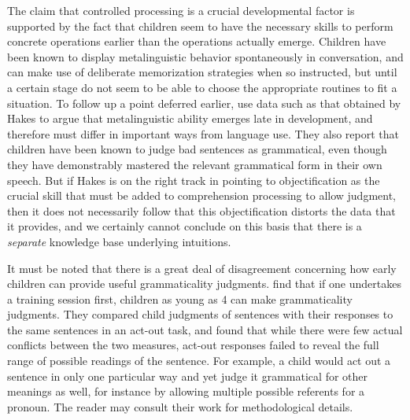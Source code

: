 The claim that controlled processing is a crucial developmental factor is supported by the fact that children seem to have the necessary skills to perform concrete operations earlier than the operations actually  emerge.  Children  have been known to display metalinguistic behavior  spontaneously  in  conversation, and can make use of deliberate memorization strategies when so instructed, but until a certain stage do not seem to be able to choose the appropriate routines to fit a situation. To follow up a point deferred earlier, \citeauthor{HirshPasekEtAl1978} use data such as that obtained by Hakes to argue that metalinguistic ability emerges late in development, and therefore must differ in important ways from language use. They also report that children have been known to judge bad sentences as grammatical, even though they have demonstrably mastered the relevant grammatical form in their own speech. But if Hakes is on the right track in pointing
to objectification as the crucial skill that must be added to comprehension processing to allow judgment, then it does not necessarily follow that this objectification distorts the data that it provides, and we certainly cannot conclude on this basis that there is a \textit{separate} knowledge base underlying intuitions.

It must be noted that there is a great deal of disagreement concerning how early children can provide useful grammaticality judgments. \citet{McDanielEtAl1990} find that if one undertakes a training session first, children as young as 4 can make grammaticality judgments. They compared child judgments of sentences with their responses to the same sentences in an act-out task, and found that while there were few actual conflicts between the two measures, act-out responses failed to reveal the full range of possible readings of the sentence. For example, a child would act out a sentence in only one particular way and yet judge it grammatical for other meanings as well, for instance by allowing multiple possible referents for a pronoun. The reader may consult their work for methodological details.

